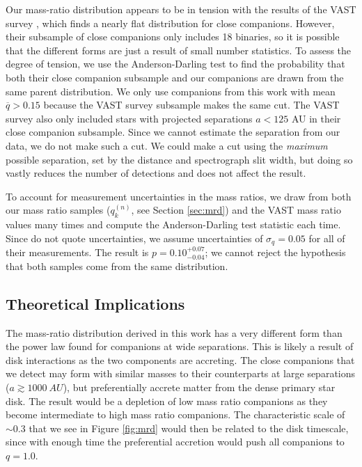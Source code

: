 \documentclass{emulateapj}
\begin{document}
Our mass-ratio distribution appears to be in tension with the results of the VAST survey \citep{DeRosa2014}, which finds a nearly flat distribution for close companions. However, their subsample of close companions only includes 18 binaries, so it is possible that the different forms are just a result of small number statistics. To assess the degree of tension, we use the Anderson-Darling  test \citep{Anderson1954} to find the probability that both their close companion subsample and our companions are drawn from the same parent distribution. We only use companions from this work with mean $\overline{q} > 0.15$ because the VAST survey subsample makes the same cut. The VAST survey also only included stars with projected separations $a < 125$ AU in their close companion subsample. Since we cannot estimate the separation from our data, we do not make such a cut. We could make a cut using the \emph{maximum} possible separation, set by the distance and spectrograph slit width, but doing so vastly reduces the number of detections and does not affect the result. 

To account for measurement uncertainties in the mass ratios, we draw from both our mass ratio samples ($q_k^{(n)}$, see Section \ref{sec:mrd}) and the VAST mass ratio values many times and compute the Anderson-Darling test statistic each time. Since \citet{DeRosa2014} do not quote uncertainties, we assume uncertainties of $\sigma_q = 0.05$ for all of their measurements. The result is $p = 0.10^{+0.07}_{-0.04}$; we cannot reject the hypothesis that both samples come from the same distribution. 


\subsection{Theoretical Implications}
\label{subsec:theory}

The mass-ratio distribution derived in this work has a very different form than the power law found for companions at wide separations. This is likely a result of disk interactions as the two components are accreting. The close companions that we detect may form with similar masses to their counterparts at large separations ($a \gtrsim 1000\ AU$), but preferentially accrete matter from the dense primary star disk. The result would be a depletion of low mass ratio companions as they become intermediate to high mass ratio companions. The characteristic scale of $\sim 0.3$ that we see in Figure \ref{fig:mrd} would then be related to the disk timescale, since with enough time the preferential accretion would push all companions to $q = 1.0$. 
\end{document}
